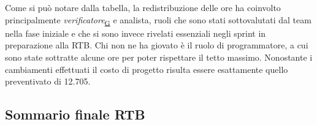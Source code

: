 \documentclass[a4paper,12pt]{article}
\begin{document}
{            Come si può notare dalla tabella, la redistribuzione delle ore ha coinvolto principalmente \textit{verificatore}\textsubscript{\href{https://atlasteam9.github.io/Atlas/glossario.html\#Verificatore}{G}} e analista, ruoli che sono stati sottovalutati dal team nella fase iniziale e che si sono invece rivelati essenziali negli sprint in preparazione alla RTB.  Chi non ne ha giovato è il ruolo di programmatore, a cui sono state sottratte alcune ore per poter rispettare il tetto massimo. Nonostante i cambiamenti effettuati il costo di progetto risulta essere esattamente quello preventivato di 12.705\texteuro.
        }

    \subsection{Sommario finale RTB}
\end{document}
